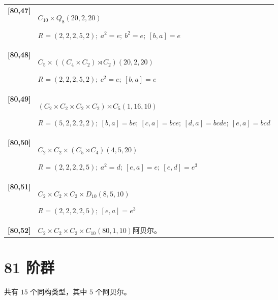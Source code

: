\documentclass[UTF8,fontset=fandol,11pt,a4paper]{ctexart}
\begin{document}
\begin{longtable}{@{}p{17mm}>{\raggedright\arraybackslash}p{141mm}@{}}
\textbf{[80,47]} & $C_{10}\times Q_{8}$\quad $(20,2,20)$\par\(R=(2,2,2,5,2);\allowbreak\ a^{2}=e;\allowbreak\ b^{2}=e;\allowbreak\ [b,a]=e\)\\[3pt]

\textbf{[80,48]} & $C_{5}\times ((C_{4}\times C_{2})\rtimes C_{2})$\quad $(20,2,20)$\par\(R=(2,2,2,5,2);\allowbreak\ c^{2}=e;\allowbreak\ [b,a]=e\)\\[3pt]

\textbf{[80,49]} & $(C_{2}\times C_{2}\times C_{2}\times C_{2})\rtimes C_{5}$\quad $(1,16,10)$\par\(R=(5,2,2,2,2);\allowbreak\ [b,a]=be;\allowbreak\ [c,a]=bce;\allowbreak\ [d,a]=bcde;\allowbreak\ [e,a]=bcd\)\\[3pt]

\textbf{[80,50]} & $C_{2}\times C_{2}\times (C_{5}\rtimes C_{4})$\quad $(4,5,20)$\par\(R=(2,2,2,2,5);\allowbreak\ a^{2}=d;\allowbreak\ [e,a]=e;\allowbreak\ [e,d]=e^{3}\)\\[3pt]

\textbf{[80,51]} & $C_{2}\times C_{2}\times C_{2}\times D_{10}$\quad $(8,5,10)$\par\(R=(2,2,2,2,5);\allowbreak\ [e,a]=e^{3}\)\\[3pt]

\textbf{[80,52]} & $C_{2}\times C_{2}\times C_{2}\times C_{10}$\quad $(80,1,10)$\quad 阿贝尔。\\[3pt]

\end{longtable}\endgroup

\section*{81 阶群}\label{order:81}

共有 $15$ 个同构类型，其中 $5$ 个阿贝尔。

\begingroup\small\setlength{\tabcolsep}{3pt}\renewcommand{\arraystretch}{1.12}
\end{document}
